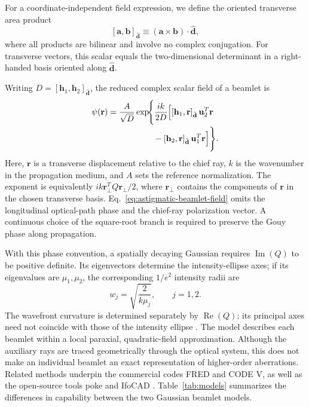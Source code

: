 \documentclass{juliacon}
\begin{document}
For a coordinate-independent field expression, we define the
oriented transverse area product
\[
    [\mathbf a,\mathbf b]_{\hat{\mathbf d}}
    \equiv
    (\mathbf a \times \mathbf b)\cdot\hat{\mathbf d},
\]
where all products are bilinear and involve no complex
conjugation.
For transverse vectors, this scalar equals the two-dimensional
determinant in a right-handed basis oriented along
$\hat{\mathbf d}$.

Writing $D=[\mathbf h_1,\mathbf h_2]_{\hat{\mathbf d}}$,
the reduced complex scalar field of a beamlet is
\begin{equation}
    \begin{aligned}
        \psi(\mathbf r)
        &= \frac{A}{\sqrt{D}}
        \exp\!\Biggl\{
            \frac{ik}{2D}
            \Bigl[
                [\mathbf h_1,\mathbf r]_{\hat{\mathbf d}}\,
                \mathbf u_2^{T}\mathbf r
        \\[-0.2em]
        &\hspace{5.5em}
                -
                [\mathbf h_2,\mathbf r]_{\hat{\mathbf d}}\,
                \mathbf u_1^{T}\mathbf r
            \Bigr]
        \Biggr\}.
    \end{aligned}
    \label{eq:astigmatic-beamlet-field}
\end{equation}
Here, $\mathbf r$ is a transverse displacement relative to the chief ray, $k$ is the
wavenumber in the propagation medium, and $A$ sets the reference
normalization.
The exponent is equivalently
$ik\mathbf r_{\perp}^{T}Q\mathbf r_{\perp}/2$,
where $\mathbf r_{\perp}$ contains the components of $\mathbf r$
in the chosen transverse basis.
Eq.~\ref{eq:astigmatic-beamlet-field} omits the longitudinal
optical-path phase and the chief-ray polarization vector.
A continuous choice of the square-root branch is required to
preserve the Gouy phase along propagation.

With this phase convention, a spatially decaying Gaussian
requires $\operatorname{Im}(Q)$ to be positive definite.
Its eigenvectors determine the intensity-ellipse axes; if its
eigenvalues are $\mu_1,\mu_2$, the corresponding $1/e^2$ intensity
radii are
\[
    w_j = \sqrt{\frac{2}{k\mu_j}},
    \qquad j=1,2.
\]
The wavefront curvature is determined separately by
$\operatorname{Re}(Q)$; its principal axes need not coincide with
those of the intensity ellipse \cite{KochkinaAO:2013}.
The model describes each beamlet within a local paraxial, quadratic-field approximation.
Although the auxiliary rays are traced geometrically through
the optical system, this does not make an individual beamlet
an exact representation of higher-order aberrations.
Related methods underpin the commercial codes FRED and CODE V,
as well as the open-source tools poke \cite{Ashcraft:2022, Ashcraft:2024}
and IfoCAD \cite{Wanner:2017}. Table~\ref{tab:models} summarizes the 
differences in capability between the two Gaussian beamlet models.
\end{document}
